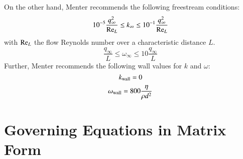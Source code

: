 \documentclass{warpdoc}
\begin{document}
On the other hand, Menter recommends \cite{aiaa:1994:menter} the following freestream conditions:
%
\begin{equation}
10^{-5} \frac{q_\infty^2}{{\rm Re}_L}\le k_\infty \le 10^{-1} \frac{q_\infty^2}{{\rm Re}_L}
\end{equation}
%
with ${\rm Re}_L$ the flow Reynolds number over a characteristic distance $L$.
%
\begin{equation}
\frac{q_\infty}{L}\le\omega_\infty\le 10 \frac{q_\infty}{L}
\end{equation}
%
Further, Menter recommends the following wall values for $k$ and $\omega$:
%
\begin{equation}
k_{\rm wall}=0
\end{equation}
%
%
\begin{equation}
\omega_{\rm wall}=800 \frac{\eta}{\rho d^2}
\end{equation}
%





\section{Governing Equations in Matrix Form}
\end{document}
